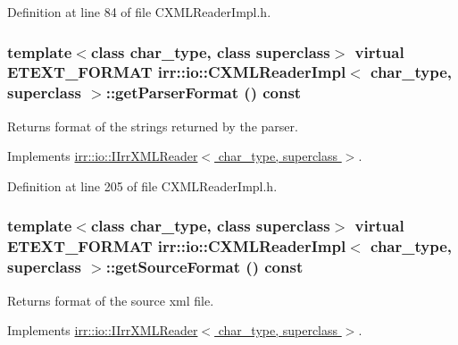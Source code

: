 Definition at line 84 of file CXMLReaderImpl.h.\hypertarget{classirr_1_1io_1_1_c_x_m_l_reader_impl_dc53297eecc7760721a6bd4d3875c12b}{
\subsubsection[{getParserFormat}]{\setlength{\rightskip}{0pt plus 5cm}template$<$class char\_\-type, class superclass$>$ virtual {\bf ETEXT\_\-FORMAT} {\bf irr::io::CXMLReaderImpl}$<$ char\_\-type, {\bf superclass} $>$::getParserFormat () const}}
\label{classirr_1_1io_1_1_c_x_m_l_reader_impl_dc53297eecc7760721a6bd4d3875c12b}


Returns format of the strings returned by the parser. 



Implements \hyperlink{classirr_1_1io_1_1_i_irr_x_m_l_reader_9af7e323c292a4836bf4a7c093b4d85a}{irr::io::IIrrXMLReader$<$ char\_\-type, superclass $>$}.

Definition at line 205 of file CXMLReaderImpl.h.\hypertarget{classirr_1_1io_1_1_c_x_m_l_reader_impl_0947ce3e44eb7c324ff1bdb430dedfa8}{
\subsubsection[{getSourceFormat}]{\setlength{\rightskip}{0pt plus 5cm}template$<$class char\_\-type, class superclass$>$ virtual {\bf ETEXT\_\-FORMAT} {\bf irr::io::CXMLReaderImpl}$<$ char\_\-type, {\bf superclass} $>$::getSourceFormat () const}}
\label{classirr_1_1io_1_1_c_x_m_l_reader_impl_0947ce3e44eb7c324ff1bdb430dedfa8}


Returns format of the source xml file. 



Implements \hyperlink{classirr_1_1io_1_1_i_irr_x_m_l_reader_00998ef2d3a562d6b2b8302c3430322d}{irr::io::IIrrXMLReader$<$ char\_\-type, superclass $>$}.

